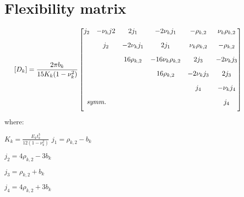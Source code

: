 \section*{Flexibility matrix}
\begin{equation}\label{eqn:flexMatrix}
  [D_k]=\frac{2\pi b_k}{15K_k(1-\nu_k^2)}
  \begin{bmatrix}
        j_2 & -\nu_kj2 & 2j_1 & -2\nu_kj_1 & -\rho_{k,2} & \nu_k\rho_{k,2} \\[2ex]
            & j_2 & -2\nu_kj_1 & 2j_1 & \nu_k\rho_{k,2} & -\rho_{k,2} \\[2ex]
            &  & 16\rho_{k,2} & -16\nu_k\rho_{k,2} & 2j_3 & -2\nu_kj_3 \\[2ex]
            &  &  & 16\rho_{k,2} & -2\nu_kj_3 & 2j_3 \\[2ex]
            &  &  &  & j_4 & -\nu_kj_4 \\[2ex]
      \rlap{\textit{symm.}} &  &  &  &  & j_4 \\[2ex]
    \end{bmatrix}
\end{equation}
where:\par
$K_k=\frac{E_kt_k^3}{12(1-\nu_k^2)}$
$j_1=\rho_{k,2}-b_k$\par
$j_2=4\rho_{k,2}-3b_k$\par
$j_3=\rho_{k,2}+b_k$\par
$j_4=4\rho_{k,2}+3b_k$\par